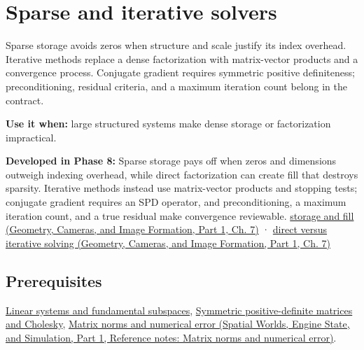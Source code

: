 \hypertarget{appendix-67c87a3d9e94}{}\label{referencestart:appendix-67c87a3d9e94}
\section{Sparse and iterative solvers}\label{appendix-67c87a3d9e94-sparse-and-iterative-solvers}

\hypertarget{appendix-67c87a3d9e94-sparse-and-iterative-solvers}{}

Sparse storage avoids zeros when structure and scale justify its index overhead. Iterative methods replace a dense factorization with matrix-vector products and a convergence process. Conjugate gradient requires symmetric positive definiteness; preconditioning, residual criteria, and a maximum iteration count belong in the contract.

\textbf{Use it when:} large structured systems make dense storage or factorization impractical.

\textbf{Developed in Phase 8:} Sparse storage pays off when zeros and dimensions outweigh indexing overhead, while direct factorization can create fill that destroys sparsity. Iterative methods instead use matrix-vector products and stopping tests; conjugate gradient requires an SPD operator, and preconditioning, a maximum iteration count, and a true residual make convergence reviewable. \href{../03-Geometry-Cameras-and-Image-Formation-P01/main.pdf\#02-foundations-ii-ch038-sparse-storage-changes-the-cost-model}{storage and fill (Geometry, Cameras, and Image Formation, Part 1, Ch. 7)} · \href{../03-Geometry-Cameras-and-Image-Formation-P01/main.pdf\#02-foundations-ii-ch038-direct-and-iterative-solvers-suit-different-workloads}{direct versus iterative solving (Geometry, Cameras, and Image Formation, Part 1, Ch. 7)}

\subsection{Prerequisites}\label{appendix-67c87a3d9e94-prerequisites}

\hypertarget{appendix-67c87a3d9e94-prerequisites}{}

\hyperref[appendix-8572a4a060c1]{Linear systems and fundamental subspaces}, \hyperref[appendix-50d2ea3c9b26]{Symmetric positive-definite matrices and Cholesky}, \href{../05-Spatial-Worlds-Engine-State-and-Simulation-P01/main.pdf\#appendix-f8657bac66e5}{Matrix norms and numerical error (Spatial Worlds, Engine State, and Simulation, Part 1, Reference notes: Matrix norms and numerical error)}.

